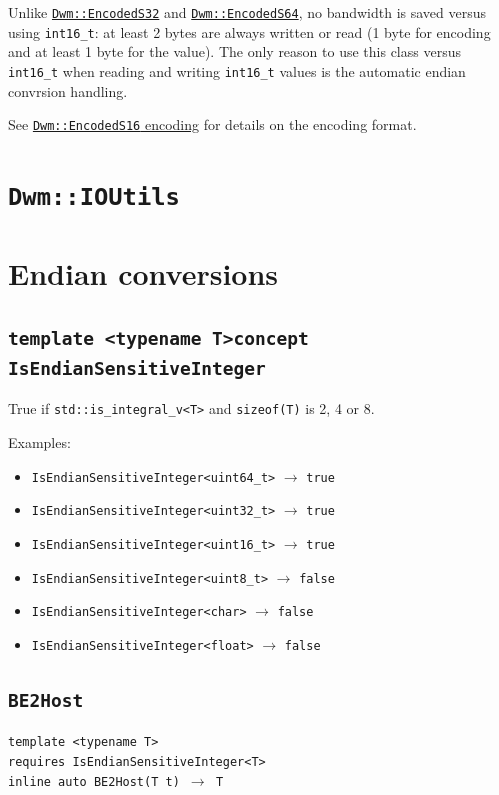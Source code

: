 Unlike \hyperref[class:EncodedS32]{\texttt{Dwm::EncodedS32}} and
\hyperref[class:EncodedS64]{\texttt{Dwm::EncodedS64}}, no bandwidth
is saved versus using \texttt{int16\_t}: at least 2 bytes are
always written or read (1 byte for encoding and at least 1 byte
for the value).  The only reason to use this class versus
\texttt{int16\_t} when reading and writing \texttt{int16\_t}
values is the automatic endian convrsion handling.

See \hyperref[encoding:DwmEncodedS16]{\texttt{Dwm::EncodedS16}
 encoding} for details on the encoding format.


\section{\texttt{Dwm::IOUtils}}

\section{Endian conversions}
\subsection{\texttt{template <typename T>\newline concept IsEndianSensitiveInteger}}
True if \texttt{std::is\_integral\_v<T>} and \texttt{sizeof(T)} is 2,
4 or 8.

Examples:
\begin{itemize}[noitemsep,nolistsep]
\item[] \texttt{IsEndianSensitiveInteger<uint64\_t>} $\rightarrow$ \texttt{true}
\item[] \texttt{IsEndianSensitiveInteger<uint32\_t>} $\rightarrow$ \texttt{true}
\item[] \texttt{IsEndianSensitiveInteger<uint16\_t>} $\rightarrow$ \texttt{true}
\item[] \texttt{IsEndianSensitiveInteger<uint8\_t>} $\rightarrow$ \texttt{false}
\item[] \texttt{IsEndianSensitiveInteger<char>} $\rightarrow$ \texttt{false}
\item[] \texttt{IsEndianSensitiveInteger<float>} $\rightarrow$ \texttt{false}
\end{itemize}

\subsection{\texttt{BE2Host}}
\texttt{template <typename T>\\
requires IsEndianSensitiveInteger<T>\\
inline auto BE2Host(T t) $\rightarrow$ T}

